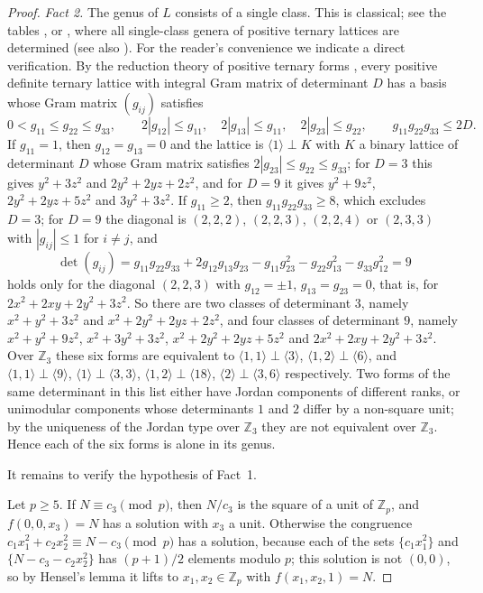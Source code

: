\documentclass[11pt]{amsart}
\theoremstyle{definition}
\theoremstyle{remark}
\newcommand{\Z}{\mathbb{Z}}
\begin{document}
\begin{proof}
\emph{Fact 2.} The genus of $L$ consists of a single class.
This is classical; see the tables \cite{BI}, or \cite{LK}, where all single-class genera of positive ternary lattices are determined
(see also \cite{JKS,JP}). For the reader's convenience we indicate a direct verification.
By the reduction theory of positive ternary forms \cite[Chapter~12]{Cassels},
every positive definite ternary lattice with integral Gram matrix of determinant $D$ has a basis whose Gram matrix $(g_{ij})$ satisfies
\[
0<g_{11}\le g_{22}\le g_{33},\qquad 2|g_{12}|\le g_{11},\quad 2|g_{13}|\le g_{11},\quad 2|g_{23}|\le g_{22},\qquad g_{11}g_{22}g_{33}\le 2D.
\]
If $g_{11}=1$, then $g_{12}=g_{13}=0$ and the lattice is $\langle 1\rangle\perp K$ with $K$ a binary lattice of determinant $D$ whose Gram matrix satisfies
$2|g_{23}|\le g_{22}\le g_{33}$; for $D=3$ this gives $y^2+3z^2$ and $2y^2+2yz+2z^2$, and for $D=9$ it gives $y^2+9z^2$, $2y^2+2yz+5z^2$ and $3y^2+3z^2$.
If $g_{11}\ge 2$, then $g_{11}g_{22}g_{33}\ge 8$, which excludes $D=3$; for $D=9$ the diagonal is $(2,2,2)$, $(2,2,3)$, $(2,2,4)$ or $(2,3,3)$ with $|g_{ij}|\le 1$ for $i\ne j$, and
\[
\det(g_{ij})=g_{11}g_{22}g_{33}+2g_{12}g_{13}g_{23}-g_{11}g_{23}^2-g_{22}g_{13}^2-g_{33}g_{12}^2=9
\]
holds only for the diagonal $(2,2,3)$ with $g_{12}=\pm1$, $g_{13}=g_{23}=0$, that is, for $2x^2+2xy+2y^2+3z^2$.
So there are two classes of determinant $3$, namely $x^2+y^2+3z^2$ and $x^2+2y^2+2yz+2z^2$, and four classes of determinant $9$, namely
$x^2+y^2+9z^2$, $x^2+3y^2+3z^2$, $x^2+2y^2+2yz+5z^2$ and $2x^2+2xy+2y^2+3z^2$.
Over $\Z_3$ these six forms are equivalent to
$\langle 1,1\rangle\perp\langle 3\rangle$, $\langle 1,2\rangle\perp\langle 6\rangle$, and
$\langle 1,1\rangle\perp\langle 9\rangle$, $\langle 1\rangle\perp\langle 3,3\rangle$, $\langle 1,2\rangle\perp\langle 18\rangle$, $\langle 2\rangle\perp\langle 3,6\rangle$ respectively.
Two forms of the same determinant in this list either have Jordan components of different ranks, or unimodular components whose determinants $1$ and $2$ differ by a non-square unit;
by the uniqueness of the Jordan type over $\Z_3$ \cite[92:2]{OMeara} they are not equivalent over $\Z_3$.
Hence each of the six forms is alone in its genus.

It remains to verify the hypothesis of Fact~1.

Let $p\ge 5$. If $N\equiv c_3\pmod p$, then $N/c_3$ is the square of a unit of $\Z_p$, and $f(0,0,x_3)=N$ has a solution with $x_3$ a unit.
Otherwise the congruence $c_1x_1^2+c_2x_2^2\equiv N-c_3\pmod p$ has a solution, because each of the sets $\{c_1x_1^2\}$ and $\{N-c_3-c_2x_2^2\}$ has $(p+1)/2$ elements modulo $p$;
this solution is not $(0,0)$, so by Hensel's lemma it lifts to $x_1,x_2\in\Z_p$ with $f(x_1,x_2,1)=N$.


\end{proof}
\end{document}
